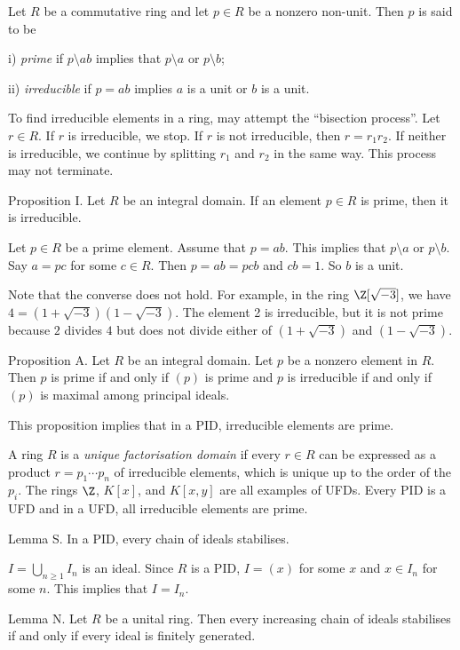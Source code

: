 Let $R$ be a commutative ring and let $p\in R$ be a nonzero non-unit. Then $p$ is said to be
\medskip
\item{i)} {\it prime} if $p\setminus ab$ implies that $p\setminus a$ or $p\setminus b$;
\smallskip
\item{ii)} {\it irreducible} if $p=ab$ implies $a$ is a unit or $b$ is a unit.
\medskip

To find irreducible elements in a ring, may attempt the ``bisection process''. Let $r\in R$. If $r$ is irreducible, we stop. If $r$ is not irreducible, then $r = r_1 r_2$. If neither is irreducible, we continue by splitting $r_1$ and $r_2$ in the same way. This process may not terminate.

\proclaim Proposition I. Let $R$ be an integral domain. If an element $p\in R$ is prime, then it is irreducible.

\proof Let $p\in R$ be a prime element. Assume that $p=ab$. This implies that $p\setminus a$ or $p\setminus b$. Say $a = pc$ for some $c\in R$. Then $p=ab=pcb$ and $cb = 1$. So $b$ is a unit.\slug

Note that the converse does not hold. For example, in the ring $\Z[\sqrt{-3}]$, we have $4=(1+\sqrt {-3})(1-\sqrt {-3})$. The element 2 is irreducible, but it is not prime because $2$ divides $4$ but does not divide either of $(1+\sqrt{-3})$ and $(1-\sqrt{-3})$.

\proclaim Proposition A. Let $R$ be an integral domain. Let $p$ be a nonzero element in $R$. Then $p$ is prime if and only if $(p)$ is prime and $p$ is irreducible if and only if $(p)$ is maximal among principal ideals.\slug

This proposition implies that in a PID, irreducible elements are prime.

A ring $R$ is a {\it unique factorisation domain} if every $r\in R$ can be expressed as a product $r = p_1\cdots p_n$ of irreducible elements, which is unique up to the order of the $p_i$. The rings $\Z$, $K[x]$, and $K[x,y]$ are all examples of UFDs. Every PID is a UFD and in a UFD, all irreducible elements are prime.

\proclaim Lemma S. In a PID, every chain of ideals stabilises.

\proof $I = \bigcup_{n\geq 1} I_n$ is an ideal. Since $R$ is a PID, $I = (x)$ for some $x$ and $x\in I_n$ for some $n$. This implies that $I = I_n$.\slug

\proclaim Lemma N. Let $R$ be a unital ring. Then every increasing chain of ideals stabilises if and only if every ideal is finitely generated.

